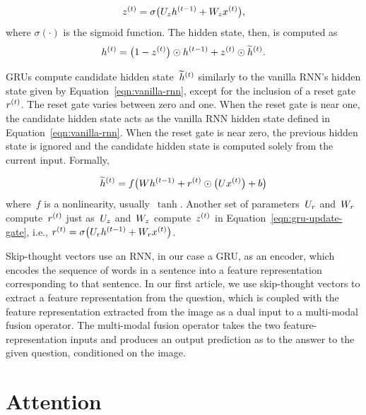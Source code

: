 \begin{equation}
z^{(t)} = \sigma\big(U_zh^{(t - 1)} + W_zx^{(t)}\big),
\label{eqn:gru-update-gate}
\end{equation}
where $\sigma(\cdot)$ is the sigmoid function.
The hidden state, then, is computed as
\begin{equation}
h^{(t)} = \big(1 - z^{(t)}\big) \odot h^{(t - 1)} + z^{(t)} \odot \widetilde{h}^{(t)}.
\label{eqn:gru-update}
\end{equation}

GRUs compute candidate hidden state~$\widetilde{h}^{(t)}$ similarly to
the vanilla RNN's hidden state given by Equation~\ref{eqn:vanilla-rnn},
except for the inclusion of a reset gate~$r^{(t)}$.
The reset gate varies between zero and one.
When the reset gate is near one, the candidate hidden state acts as the vanilla
RNN hidden state defined in Equation~\ref{eqn:vanilla-rnn}.
When the reset gate is near zero, the previous hidden state is ignored and the
candidate hidden state is computed solely from the current input.
Formally,

\begin{equation}
\widetilde{h}^{(t)} = f\big(Wh^{(t - 1)} + r^{(t)}\odot\big(Ux^{(t)}\big) + b\big)
\end{equation}
where~$f$ is a nonlinearity, usually~$\tanh$.
Another set of parameters~$U_r$ and~$W_r$ compute~$r^{(t)}$
just as~$U_z$ and~$W_z$ compute~$z^{(t)}$ in
Equation~\ref{eqn:gru-update-gate}, i.e.,
$r^{(t)} = \sigma\big(U_rh^{(t - 1)} + W_rx^{(t)}\big)$.

Skip-thought vectors use an RNN, in our case a GRU, as an encoder, which
encodes the sequence of words in a sentence into a feature representation
corresponding to that sentence.
In our first article, we use skip-thought vectors to extract a feature
representation from the question, which is coupled with the feature
representation extracted from the image as a dual input to a multi-modal fusion
operator.
The multi-modal fusion operator takes the two feature-representation inputs and
produces an output prediction as to the answer to the given question,
conditioned on the image.


\section{Attention}

